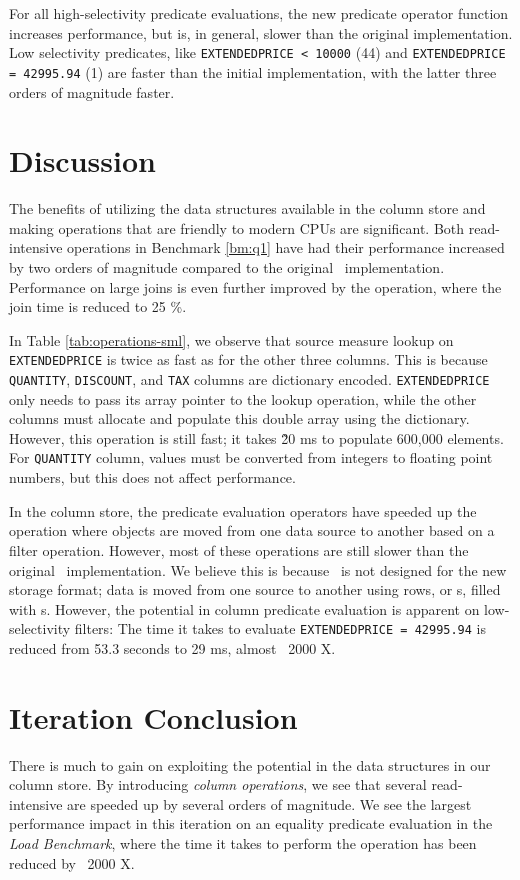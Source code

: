 For all high-selectivity predicate evaluations, the new predicate operator function increases performance, but is, in general, slower than the original implementation. Low selectivity predicates, like \texttt{EXTENDEDPRICE < 10000} (44) and \texttt{EXTENDEDPRICE = 42995.94} (1) are faster than the initial implementation, with the latter three orders of magnitude faster.

\section{Discussion}
\label{sec:Discussion}
The benefits of utilizing the data structures available in the column store and making operations that are friendly to modern CPUs are significant. Both read-intensive operations in Benchmark \ref{bm:q1} have had their performance increased by two orders of magnitude compared to the original \gap~implementation. Performance on large joins is even further improved by the  operation, where the join time is reduced to 25 \%.

In Table \ref{tab:operations-sml}, we observe that source measure lookup on \texttt{EXTENDEDPRICE} is twice as fast as for the other three columns. This is because \texttt{QUANTITY}, \texttt{DISCOUNT}, and \texttt{TAX} columns are dictionary encoded. \texttt{EXTENDEDPRICE} only needs to pass its array pointer to the lookup operation, while the other columns must allocate and populate this double array using the dictionary. However, this operation is still fast; it takes \~20 ms to populate 600,000 elements. For \texttt{QUANTITY} column, values must be converted from integers to floating point numbers, but this does not affect performance.

In the column store, the predicate evaluation operators have speeded up the operation where objects are moved from one data source to another based on a filter operation. However, most of these operations are still slower than the original \gap~implementation. We believe this is because \gap~is not designed for the new storage format; data is moved from one source to another using rows, or s, filled with s. However, the potential in column predicate evaluation is apparent on low-selectivity filters: The time it takes to evaluate \texttt{EXTENDEDPRICE = 42995.94} is reduced from 53.3 seconds to 29 ms, almost ~2000 X.

\section{Iteration Conclusion}
\label{sec:Chapter Conclusion}
There is much to gain on exploiting the potential in the data structures in our column store. By introducing \textit{column operations}, we see that several read-intensive are speeded up by several orders of magnitude. We see the largest performance impact in this iteration on an equality predicate evaluation in the \textit{Load Benchmark}, where the time it takes to perform the operation has been reduced by ~2000 X.

